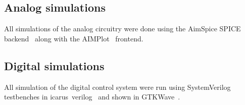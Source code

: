 \subsection{Analog simulations}

All simulations of the analog circuitry were done using the AimSpice SPICE backend~\cite{AIMSpice} along with the AIMPlot~\cite{aimplot} frontend.


\subsection{Digital simulations}

All simulation of the digital control system were run using SystemVerilog testbenches in icarus~verilog~\cite{icarusVL} and shown in GTKWave~\cite{gtkwave}.